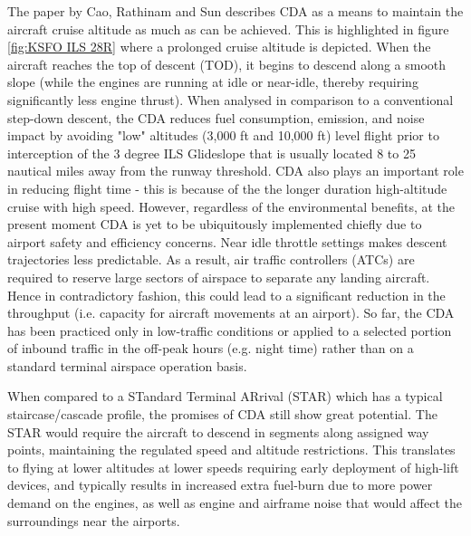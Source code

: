 \documentclass{aer1315-pretty}
\begin{document}
The paper by Cao, Rathinam and Sun \cite{Cao:2011} describes CDA as a means to maintain the aircraft cruise altitude as much as can be achieved. This is highlighted in figure \ref{fig:KSFO ILS 28R} where a prolonged cruise altitude is depicted. When the aircraft reaches the top of descent (TOD), it begins to descend along a smooth slope (while the engines are running at idle or near-idle, thereby requiring significantly less engine thrust). When analysed in comparison to a conventional step-down descent, the CDA reduces fuel consumption, emission, and noise impact by avoiding "low" altitudes
(3,000 ft and 10,000 ft) level flight prior to interception of the 3 degree ILS Glideslope that is usually located 8 to 25 nautical miles away from the runway threshold. CDA also plays an important role in reducing flight time - this is because of the the longer duration high-altitude cruise with high speed. However, regardless of the environmental benefits, at the present moment CDA is yet to be ubiquitously implemented chiefly due to airport safety and efficiency concerns. Near idle throttle settings makes descent trajectories less predictable. As a result, air traffic controllers (ATCs) are required to reserve large sectors of airspace to separate any landing aircraft. Hence in contradictory fashion, this could lead to a significant reduction in the throughput (i.e. capacity for aircraft movements at an airport). So far, the CDA has been practiced only in low-traffic conditions or applied to a selected portion of inbound traffic in the off-peak hours (e.g. night time) rather than on a standard terminal airspace operation basis.\par 

When compared to a STandard Terminal ARrival (STAR) which has a typical staircase/cascade profile, the promises of CDA still show great potential. The STAR would require the aircraft to descend in segments along assigned way points, maintaining the regulated speed and altitude restrictions. This translates to flying at lower altitudes at lower speeds requiring early deployment of high-lift devices, and typically results in increased extra fuel-burn due to more power demand on the engines, as well as engine and airframe noise that would affect the surroundings near the airports.\par
\end{document}
